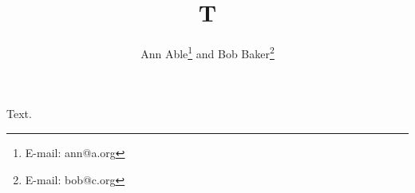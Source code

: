 \documentclass[aps,preprint,nofootinbib]{revtex4}
\begin{document}
\title{T}
\author{Ann Able\footnote[1]{E-mail: ann@a.org} and Bob Baker\footnote[2]{E-mail: bob@c.org}}
\maketitle
Text.
\end{document}
